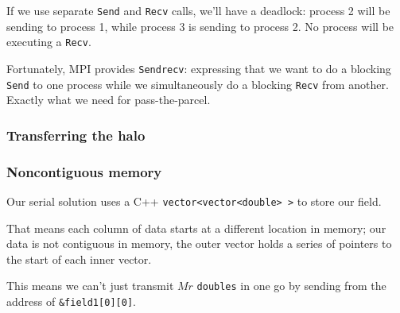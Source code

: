 If we use separate \texttt{Send} and \texttt{Recv} calls, we'll have a
deadlock: process 2 will be sending to process 1, while process 3 is
sending to process 2. No process will be executing a \texttt{Recv}.

Fortunately, MPI provides \texttt{Sendrecv}: expressing that we want to
do a blocking \texttt{Send} to one process while we simultaneously do a
blocking \texttt{Recv} from another. Exactly what we need for
pass-the-parcel.

\subsubsection{Transferring the halo}\label{transferring-the-halo-1}

\begin{Shaded}
\begin{Highlighting}[]

 
\NormalTok{\}}
\end{Highlighting}
\end{Shaded}

\subsubsection{Noncontiguous memory}\label{noncontiguous-memory}

Our serial solution uses a C++
\texttt{vector\textless{}vector\textless{}double\textgreater{} \textgreater{}}
to store our field.

That means each column of data starts at a different location in memory;
our data is not contiguous in memory, the outer vector holds a series of
pointers to the start of each inner vector.

This means we can't just transmit $Mr$ \texttt{doubles} in one go by
sending from the address of \texttt{\&field1{[}0{]}{[}0{]}}.

